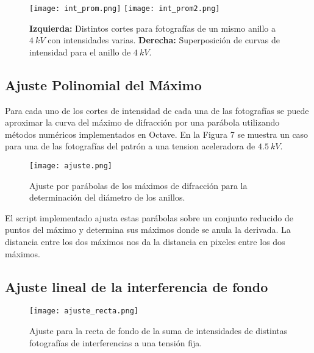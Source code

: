 \documentclass[a4paper, 10pt, spanish]{article}
\numberwithin{equation}{section}
\numberwithin{table}{section}
\begin{document}
\begin{figure}[t]
    \begin{center}

      \texttt{[image: int\_prom.png]}
      \hspace{0.5cm}
      \texttt{[image: int\_prom2.png]}
    \end{center}
    \caption{\textbf{Izquierda:} Distintos cortes para fotografías de un mismo anillo a $4\ kV$ con intensidades varias. \textbf{Derecha:} Superposición de curvas de intensidad para el anillo de $4\ kV$.}
    \label{fig:distanciasinterplanares}
    \end{figure}

\newpage
\subsection{Ajuste Polinomial del Máximo}

Para cada uno de los cortes de intensidad de cada una de las fotografías se puede aproximar la curva del máximo de difracción por una parábola utilizando métodos numéricos implementados en Octave. En la Figura 7 se muestra un caso para una de las fotografías del patrón a una tension aceleradora de $4.5\ kV$.

\begin{figure}[h]
    \begin{center}

     
      \texttt{[image: ajuste.png]}
    \end{center}
    \caption{Ajuste por parábolas de los máximos de difracción para la determinación del diámetro de los anillos.}
    \label{fig:distanciasinterplanares}
    \end{figure}

El script implementado ajusta estas parábolas sobre un conjunto reducido de puntos del máximo y determina sus máximos donde se anula la derivada. La distancia entre los dos máximos nos da la distancia en pixeles entre los dos máximos.

\subsection{Ajuste lineal de la interferencia de fondo}
\begin{figure}[h]
    \begin{center}

     
      \texttt{[image: ajuste\_recta.png]}
    \end{center}
    \caption{Ajuste para la recta de fondo de la suma de intensidades de distintas fotografías de interferencias a una tensión fija.}
    \label{fig:distanciasinterplanares}
    \end{figure}
\end{document}
